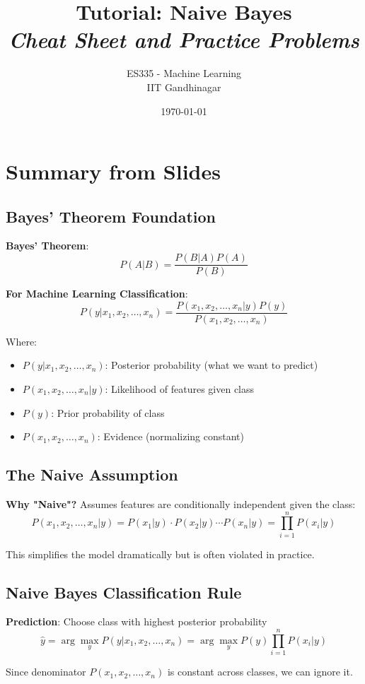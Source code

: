\documentclass{article}
\title{\textbf{Tutorial: Naive Bayes} \\ \textit{Cheat Sheet and Practice Problems}}
\author{ES335 - Machine Learning \\ IIT Gandhinagar}
\date{\today}
\begin{document}
\maketitle

\section{Summary from Slides}

\subsection{Bayes' Theorem Foundation}

\textbf{Bayes' Theorem}:
$$P(A|B) = \frac{P(B|A)P(A)}{P(B)}$$

\textbf{For Machine Learning Classification}:
$$P(y|x_1, x_2, \ldots, x_n) = \frac{P(x_1, x_2, \ldots, x_n|y)P(y)}{P(x_1, x_2, \ldots, x_n)}$$

Where:
\begin{itemize}
    \item $P(y|x_1, x_2, \ldots, x_n)$: Posterior probability (what we want to predict)
    \item $P(x_1, x_2, \ldots, x_n|y)$: Likelihood of features given class
    \item $P(y)$: Prior probability of class
    \item $P(x_1, x_2, \ldots, x_n)$: Evidence (normalizing constant)
\end{itemize}

\subsection{The Naive Assumption}

\textbf{Why "Naive"?} Assumes features are conditionally independent given the class:
$$P(x_1, x_2, \ldots, x_n|y) = P(x_1|y) \cdot P(x_2|y) \cdots P(x_n|y) = \prod_{i=1}^{n} P(x_i|y)$$

This simplifies the model dramatically but is often violated in practice.

\subsection{Naive Bayes Classification Rule}

\textbf{Prediction}: Choose class with highest posterior probability
$$\hat{y} = \arg\max_{y} P(y|x_1, x_2, \ldots, x_n) = \arg\max_{y} P(y)\prod_{i=1}^{n} P(x_i|y)$$

Since denominator $P(x_1, x_2, \ldots, x_n)$ is constant across classes, we can ignore it.
\end{document}

